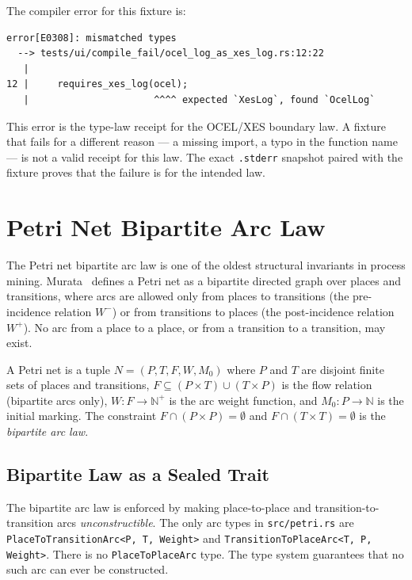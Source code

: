The compiler error for this fixture is:

\begin{verbatim}
error[E0308]: mismatched types
  --> tests/ui/compile_fail/ocel_log_as_xes_log.rs:12:22
   |
12 |     requires_xes_log(ocel);
   |                      ^^^^ expected `XesLog`, found `OcelLog`
\end{verbatim}

This error is the type-law receipt for the OCEL/XES boundary law. A
fixture that fails for a different reason --- a missing import, a typo in the function name
--- is not a valid receipt for this law. The exact \texttt{.stderr} snapshot paired with the
fixture proves that the failure is for the intended law.

\section{Petri Net Bipartite Arc Law}
\label{sec:canon-petri}

The Petri net bipartite arc law is one of the oldest structural invariants in process
mining. Murata~\cite{murata1989petri} defines a Petri net as a bipartite directed graph
over places and transitions, where arcs are allowed only from places to transitions (the
pre-incidence relation $W^-$) or from transitions to places (the post-incidence relation
$W^+$). No arc from a place to a place, or from a transition to a transition, may exist.

\begin{definition}
\label{def:petri-bipartite}
A Petri net is a tuple $N = (P, T, F, W, M_0)$ where $P$ and $T$ are disjoint finite
sets of places and transitions, $F \subseteq (P \times T) \cup (T \times P)$ is the flow
relation (bipartite arcs only), $W: F \to \mathbb{N}^+$ is the arc weight function, and
$M_0: P \to \mathbb{N}$ is the initial marking. The constraint
$F \cap (P \times P) = \emptyset$ and $F \cap (T \times T) = \emptyset$ is the
\emph{bipartite arc law}.
\end{definition}

\subsection{Bipartite Law as a Sealed Trait}

The bipartite arc law is enforced by making place-to-place and transition-to-transition
arcs \emph{unconstructible}. The only arc types in \texttt{src/petri.rs} are
\texttt{PlaceToTransitionArc<P, T, Weight>} and \texttt{TransitionToPlaceArc<T, P, Weight>}.
There is no \texttt{PlaceToPlaceArc} type. The type system guarantees that no such arc
can ever be constructed.

